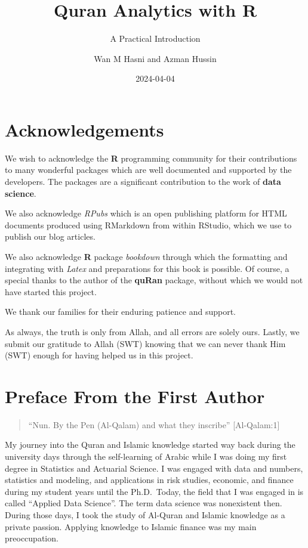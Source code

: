 \documentclass[
]{article}
\title{Quran Analytics with R}
\subtitle{A Practical Introduction}
\author{Wan M Hasni and Azman Hussin}
\date{2024-04-04}
\begin{document}
\maketitle

{
\setcounter{tocdepth}{2}
\tableofcontents
}
\hypertarget{acknowledgements}{%
\section*{Acknowledgements}\label{acknowledgements}}

We wish to acknowledge the \textbf{R} programming community for their contributions to many wonderful packages which are well documented and supported by the developers. The packages are a significant contribution to the work of \textbf{data science}.

We also acknowledge \emph{RPubs} which is an open publishing platform for HTML documents produced using RMarkdown from within RStudio, which we use to publish our blog articles.

We also acknowledge \textbf{R} package \emph{bookdown} through which the formatting and integrating with \emph{Latex} and preparations for this book is possible. Of course, a special thanks to the author of the \textbf{quRan} package, without which we would not have started this project.

We thank our families for their enduring patience and support.

As always, the truth is only from Allah, and all errors are solely ours. Lastly, we submit our gratitude to Allah (SWT) knowing that we can never thank Him (SWT) enough for having helped us in this project.

\hypertarget{preface-from-the-first-author}{%
\section*{Preface From the First Author}\label{preface-from-the-first-author}}

\begin{quote}
``Nun. By the Pen (Al-Qalam) and what they inscribe'' {[}Al-Qalam:1{]}
\end{quote}

My journey into the Quran and Islamic knowledge started way back during the university days through the self-learning of Arabic while I was doing my first degree in Statistics and Actuarial Science. I was engaged with data and numbers, statistics and modeling, and applications in risk studies, economic, and finance during my student years until the Ph.D.~Today, the field that I was engaged in is called ``Applied Data Science''. The term data science was nonexistent then. During those days, I took the study of Al-Quran and Islamic knowledge as a private passion. Applying knowledge to Islamic finance was my main preoccupation.
\end{document}

